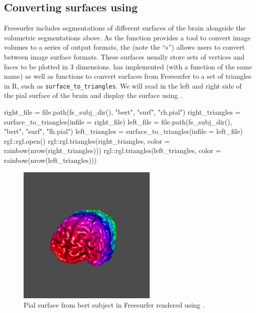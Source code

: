 \subsection{\texorpdfstring{Converting surfaces using
}{Converting surfaces using }}\label{converting-surfaces-using}

Freesurfer includes segmentations of different surfaces of the brain
alongside the volumetric segmentations above. As the 
function provides a tool to convert image volumes to a series of output
formats, the  (note the ``s'') allows users to
convert between image surface formats. These surfaces usually store sets
of vertices and faces to be plotted in 3 dimensions. 
has implemented  (with a function of the same name)
as well as functions to convert surfaces from Freesurfer to a set of
triangles in R, such as \texttt{surface\_to\_triangles}. We will read in
the left and right side of the pial surface of the brain and display the
surface using  \citep{rgl}.

\begin{Schunk}
\begin{Sinput}
right_file = file.path(fs_subj_dir(), 
                   "bert", "surf", "rh.pial")
right_triangles = surface_to_triangles(infile = right_file)
left_file = file.path(fs_subj_dir(), 
                   "bert", "surf", "lh.pial")
left_triangles = surface_to_triangles(infile = left_file) 
rgl::rgl.open()
rgl::rgl.triangles(right_triangles, 
                   color = rainbow(nrow(right_triangles)))
rgl::rgl.triangles(left_triangles, 
                   color = rainbow(nrow(left_triangles)))
\end{Sinput}
\end{Schunk}

\begin{figure}
\centering
\includegraphics{muschelli_files/figure-latex/rgl_plot_out.png}
\caption{Pial surface from bert subject in Freesurfer rendered using
.}
\end{figure}

